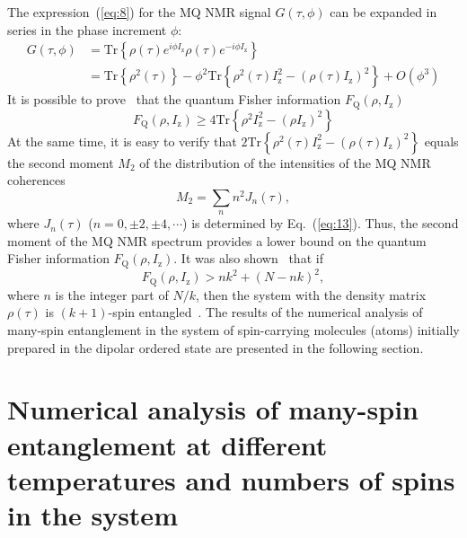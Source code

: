 \documentclass[review]{elsarticle}
\begin{document}
The expression~(\ref{eq:8}) for the MQ NMR signal $G(\tau,\phi)$ can be expanded in series in the phase increment $\phi$:
%
\begin{equation}
    \begin{split}
        \label{eq:17}
        G(\tau,\phi)  
        & = \mathrm{Tr} \left\{ 
            \rho(\tau) e^{i \phi I_\mathrm{z} }
            \rho(\tau) e^{-i\phi I_\mathrm{z}}
        \right\}  \\
        & = \mathrm{Tr} \left\{ \rho^2(\tau) \right\} 
        - \phi^2 \mathrm{Tr} \left\{ 
            \rho^2(\tau) I^2_\mathrm{z} 
            - (\rho(\tau) I_\mathrm{z})^2
        \right\} 
        + O(\phi^3)
    \end{split}
\end{equation}
%
It is possible to prove~\cite{Girolami_2017} that the quantum Fisher information $F_\mathrm{Q}(\rho,I_\mathrm{z})$~\cite{Helstrom_1976}
%
\begin{equation}
    \label{eq:18}
    F_\mathrm{Q}(\rho,I_\mathrm{z}) \geq 4 \mathrm{Tr} \left\{ \rho^2 I^2_\mathrm{z} - (\rho I_\mathrm{z})^2 \right\}
\end{equation}
%
At the same time, it is easy to verify that $2 \mathrm{Tr} \left\{ \rho^2(\tau) I_\mathrm{z}^2 - \left( \rho(\tau) I_\mathrm{z} \right)^2 \right\}$ equals the second moment $M_2$ of the distribution of the intensities of the MQ NMR coherences~\cite{Khitrin_1997}
%
\begin{equation}
    \label{eq:19}
    M_2 = \sum_{n} n^2 J_n (\tau) ,
\end{equation}
%
where $J_n(\tau)$ ($n=0,\pm 2, \pm 4, \cdots$) is determined by Eq.~(\ref{eq:13}).
Thus, the second moment of the MQ NMR spectrum provides a lower bound on the quantum Fisher information $F_\mathrm{Q}(\rho,I_\mathrm{z})$.
It was also shown~\cite{T_th_2014,Pezz__2018} that if
%
\begin{equation}
    \label{eq:20}
    F_\mathrm{Q} (\rho,I_\mathrm{z}) > n k^2 + (N - n k)^2,
\end{equation}
%
where $n$ is the integer part of ${N/k}$, then the system with the density matrix $\rho(\tau)$ is $(k+1)$-spin entangled~\cite{Pezz__2009,Hyllus_2012,T_th_2012}.
The results of the numerical analysis of many-spin entanglement in the system of spin-carrying molecules (atoms) initially prepared in the dipolar ordered state are presented in the following section.



\section{Numerical analysis of many-spin entanglement at different temperatures and numbers of spins in the system}
\label{sec:5}
\end{document}
